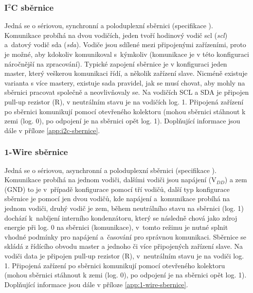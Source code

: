 \subsubsection{I$^2$C sběrnice}
Jedná se o sériovou, synchronní a poloduplexní sběrnici (specifikace \cite{i2c-sbernice-specifikace}). Komunikace probíhá na dvou vodičích, jeden tvoří hodinový vodič \acrshort{scl} (\textit{\acrlong{scl}}) a~datový vodič \acrshort{sda} (\textit{\acrlong{sda}}). Vodiče jsou sdílené mezi připojenými zařízeními, proto je možné, aby kdokoliv komunikoval s~kýmkoliv (komunikace je v této konfiguraci náročnější na zpracování). Typické zapojení sběrnice je v konfiguraci jeden master, který veškerou komunikaci řídí, a několik zařízení slave. Nicméně existuje varianta s více mastery, existuje sada pravidel, jak se musí chovat, aby mohly na sběrnici pracovat společně a neovlivňovaly se. Na vodičích SCL a SDA je připojen pull-up rezistor (R), v neutrálním stavu je na vodičích log. 1. Připojená zařízení po sběrnici komunikují pomocí otevřeného kolektoru (mohou sběrnici stáhnout k zemi (log. 0), po odpojení je na sběrnici opět log. 1). \cite{dudka-i2c-relativene-jednoduse} Doplňující informace jsou dále v příloze \ref{app:i2c-sbernice}.

\subsubsection{1-Wire sběrnice}
\label{sec:1-wire-sbernice}
Jedná se o sériovou, asynchronní a poloduplexní sběrnici (specifikace \cite{1-wire-sbernice-specifikace}). Komunikace probíhá na jednom vodiči, dalšími vodiči jsou napájení (V$_{DD}$) a zem (GND) to je v~případě konfigurace pomocí tří vodičů, další typ konfigurace sběrnice je pomocí jen dvou vodičů, kde napájení a~komunikace probíhá na jednom vodiči, druhý vodič je zem, během neutrálního stavu na sběrnici (log. 1) dochází k~nabíjení interního kondenzátoru, který se následně chová jako zdroj energie při log. 0 na sběrnici (komunikace), v~tomto režimu je nutné splnit vhodné podmínky pro napájení a~časování pro správnou komunikaci. Sběrnice se skládá z řídícího obvodu master a jednoho či více připojených zařízení slave. Na vodiči data je připojen pull-up rezistor (R), v~neutrálním stavu je na vodiči log. 1. Připojená zařízení po sběrnici komunikují pomocí otevřeného kolektoru (mohou sběrnici stáhnout k zemi (log. 0), po odpojení je na sběrnici opět log. 1). \cite{maly-1-wire-sbernice} Doplňující informace jsou dále v příloze \ref{app:1-wire-sbernice}.




